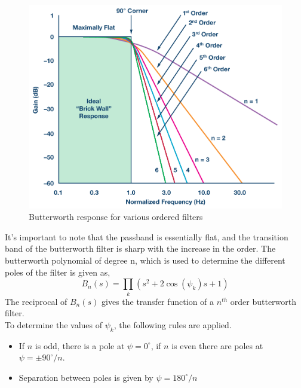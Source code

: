 \documentclass{lab_sheet}
\begin{document}
     \begin{figure}[H]
        \centering
        \includegraphics[width=0.6\linewidth]{../Figures/butter.png}
        \caption{Butterworth response for various ordered filters}
        \label{fig:butter}
     \end{figure}
     It's important to note that the passband is essentially flat, and the transition band of the butterworth filter is sharp with the increase in the order.
     The butterworth polynomial of degree n, which is used to determine the different poles of the filter is given as,
     \begin{equation}
        B_n(s)=\prod_k\left(s^2+2\cos(\psi_k)s+1\right)
     \end{equation}
     The reciprocal of $B_n(s)$ gives the transfer function of a $n^{th}$ order butterworth filter.
   \\
   To determine the values of $\psi_k$, the following rules are applied.
   \begin{itemize}
      \item If $n$ is odd, there is a pole at $\psi=0^{\circ}$, if $n$ is even there are poles at $\psi=\pm90^{\circ}/n$.
      \item Separation between poles is given by $\psi=180^{\circ}/n$
   \end{itemize}
\end{document}
